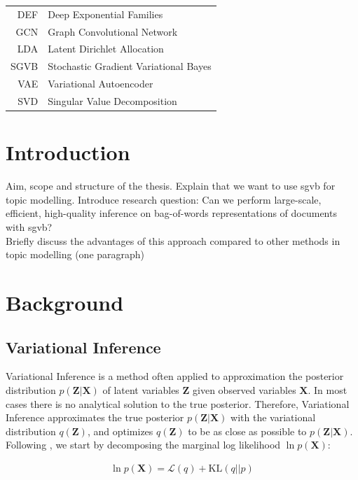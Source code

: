 \documentclass{report}
\begin{document}
\begin{tabular}{r l}
	\hspace{10mm} 
	DEF & Deep Exponential Families \\
	GCN & Graph Convolutional Network \\
	LDA & Latent Dirichlet Allocation \\
	SGVB & Stochastic Gradient Variational Bayes \\
	VAE & Variational Autoencoder \\
	SVD & Singular Value Decomposition \\
\end{tabular}

\tableofcontents

\doublespacing

\chapter{Introduction}
Aim, scope and structure of the thesis. 
Explain that we want to use sgvb for topic modelling. Introduce research question:
Can we perform large-scale, efficient, high-quality inference on bag-of-words representations of documents with sgvb? \\
Briefly discuss the advantages of this approach compared to other methods in topic modelling (one paragraph)


\pagebreak 
\nocite{*}


\chapter{Background}
\section{Variational Inference}\label{varinf}
Variational Inference is a method often applied to approximation the posterior distribution $p(\mathbf{Z}|\mathbf{X})$ of latent variables $\mathbf{Z}$ given observed variables $\mathbf{X}$. In most cases there is no analytical solution to the true posterior. Therefore, Variational Inference approximates the true posterior $p(\mathbf{Z}|\mathbf{X})$ with the variational distribution $q(\mathbf{Z})$, and optimizes $q(\mathbf{Z})$ to be as close as possible to $p(\mathbf{Z}|\mathbf{X})$. \\
Following \cite{bishop2006pattern}, we start by decomposing the marginal log likelihood $\ln p(\mathbf{X})$:

\begin{align}\label{lowKL}
\ln p(\mathbf{X}) = \mathcal{L}(q) + \text{KL}(q||p)
\end{align}
\end{document}
